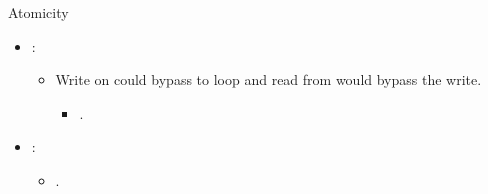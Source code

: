 \begin{frame}[t]{Atomicity}
\makebox[\textwidth][c]{}
\begin{itemize}
  \item {}:
    \begin{itemize}
      \item Write on  could bypass to
             loop and read from  would bypass the write.
        \begin{itemize}
          \item {}.
        \end{itemize}
    \end{itemize}
  \item {}:
    \begin{itemize}
      \item {}.
    \end{itemize}
\end{itemize}
\end{frame}

